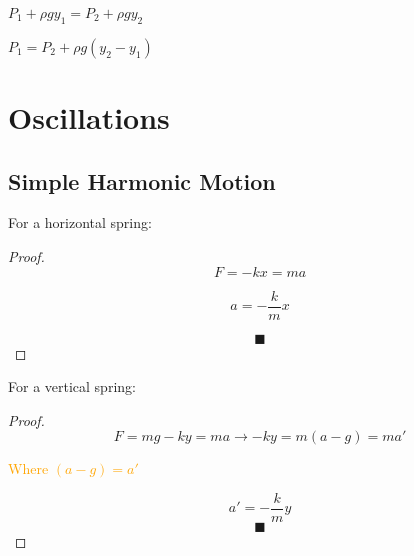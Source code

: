   \begin{equation*}
      P_1 + \rho gy_1 = P_2 + \rho gy_2
    \phantom{\hspace{12cm}}
  \end{equation*}

  \begin{equation*}
      P_1 = P_2 + \rho g(y_2 - y_1)
    \phantom{\hspace{12cm}}
  \end{equation*}

\chapter*{Oscillations}

\section*{Simple Harmonic Motion}

\begin{minipage}{0.5\textwidth}
    For a horizontal spring:
    \begin{proof}
      \begin{equation*}
        F = -kx = ma
      \end{equation*}

      \begin{equation*}
        a = - \frac{k}{m}x
      \end{equation*}

      \[\blacksquare\]
    \end{proof}

  \vspace{0.5cm}
  \end{minipage}
  \begin{minipage}{0.5\textwidth}
    For a vertical spring:

    \begin{proof}
      \begin{equation*}
        F = mg - ky = ma \rightarrow -ky = m (a - g) = ma'
      \end{equation*}

        \textcolor{orange}{Where $(a - g) = a'$}

      \begin{equation*}
        a' = - \frac{k}{m}y
      \end{equation*}
      \[\blacksquare\]
    \end{proof}
  \end{minipage}

